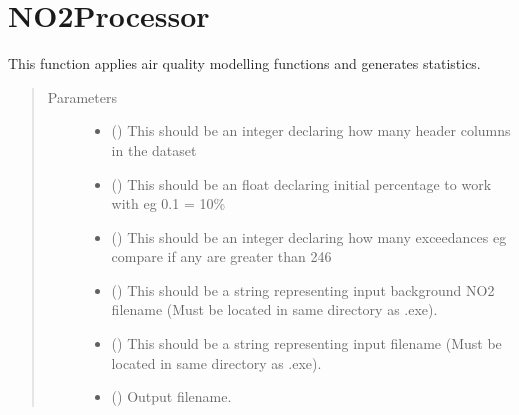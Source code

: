 \documentclass[letterpaper,10pt,english,openany,oneside]{sphinxmanual}
\begin{document}
\chapter{NO2Processor}
\label{\detokenize{index:no2processor}}\label{\detokenize{index:module-NO2Processor}}

\begin{fulllineitems}
\label{\detokenize{index:NO2Processor.process}}
This function applies air quality modelling functions and generates statistics.
\begin{quote}\begin{description}
\item[{Parameters}] \leavevmode\begin{itemize}
\item {} 
 () \textendash{} This should be an integer declaring how many header columns in the dataset

\item {} 
 () \textendash{} This should be an float declaring initial percentage to work with eg 0.1 = 10\%

\item {} 
 () \textendash{} This should be an integer declaring how many exceedances eg compare if any are greater than 246

\item {} 
 () \textendash{} This should be a string representing input background NO2 filename (Must be located in same directory as .exe).

\item {} 
 () \textendash{} This should be a string representing input filename (Must be located in same directory as .exe).

\item {} 
 () \textendash{} Output filename.

\end{itemize}

\end{description}\end{quote}

\end{fulllineitems}
\end{document}
